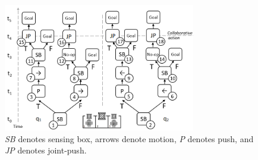 \documentclass[letterpaper]{article} %
\theoremstyle{definition}
\begin{document}
\begin{figure}[t]
\centering
\includegraphics[width=3.3in]{LocalTrees.png}
\caption{\emph{SB} denotes sensing box, arrows denote motion, {\em P} denotes push,
and \emph{JP} denotes joint-push.
}
\label{fig:LocalTrees}
\end{figure}
\end{document}
